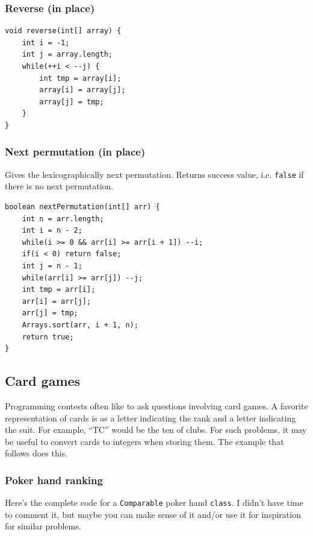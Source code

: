 \documentclass[a4paper,12pt]{article}
\begin{document}
\subsubsection{Reverse (in place)}
\begin{lstlisting}
void reverse(int[] array) {
	int i = -1;
	int j = array.length;
	while(++i < --j) {
		int tmp = array[i];
		array[i] = array[j];
		array[j] = tmp;
	}
}
\end{lstlisting}

\subsubsection{Next permutation (in place)}
Gives the lexicographically next permutation. Returns success value, i.e. \verb/false/ if there is no next permutation.
\begin{lstlisting}
boolean nextPermutation(int[] arr) {
	int n = arr.length;
	int i = n - 2;
	while(i >= 0 && arr[i] >= arr[i + 1]) --i;
	if(i < 0) return false;
	int j = n - 1;
	while(arr[i] >= arr[j]) --j;
	int tmp = arr[i];
	arr[i] = arr[j];
	arr[j] = tmp;
	Arrays.sort(arr, i + 1, n);
	return true;
}
\end{lstlisting}

\subsection{Card games}
Programming contests often like to ask questions involving card games. A favorite representation of cards is as a letter indicating the rank and a letter indicating the suit. For example, ``TC'' would be the ten of clubs. For such problems, it may be useful to convert cards to integers when storing them. The example that follows does this.

\subsubsection{Poker hand ranking}
\noindent Here's the complete code for a \verb/Comparable/ poker hand \verb/class/. I didn't have time to comment it, but maybe you can make sense of it and/or use it for inspiration for similar problems.
\end{document}
